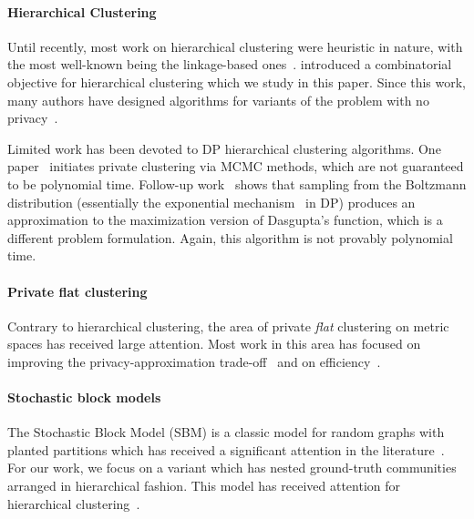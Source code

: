 \paragraph{Hierarchical Clustering}
Until recently, most work on hierarchical clustering were heuristic in nature, with the most well-known being the linkage-based ones~\citep{J10,bateni2017affinity}. \citet{dasgupta2016cost} introduced a combinatorial objective for hierarchical clustering which we study in this paper. Since this work, many authors have designed algorithms for variants of the problem with no privacy~\citep{cohen2017hierarchical,cohen2019hierarchical, charikar2017approximate,moseley2017approximation, agarwal2022sublinear,chatziafratis2020bisect}.

Limited work has been devoted to DP hierarchical clustering algorithms. One paper~\citep{xiao2014differentially} initiates private clustering via MCMC methods, which are not guaranteed to be polynomial time. Follow-up work~\citep{kolluri2021private} shows that sampling from the Boltzmann distribution (essentially the exponential mechanism~\citep{mcsherry2007mechanism} in DP) produces an approximation to the maximization version of Dasgupta's function, which is a different problem formulation. Again, this algorithm is not provably polynomial time.

\paragraph{Private flat clustering}
Contrary to hierarchical clustering, the area of private {\it flat} clustering on metric spaces has received large attention. Most work in this area has focused on improving the privacy-approximation trade-off~\citep{ghazi2020differentially,balcan2017differentially} and on efficiency~\citep{hegde2021sok,cohennear,cohen2022scalable}.

\paragraph{Stochastic block models}

The Stochastic Block Model (SBM) is a classic model for random graphs with planted partitions which has received a significant attention in the literature~\citep{MR3520025-Guedon16,montanari2016semidefinite, moitra2016robust,MR4115142,ding2022robust,Liu-Moitra-minimax}. For our work, we focus on a variant which has nested ground-truth communities arranged in hierarchical fashion. This model has received attention for hierarchical clustering~\citep{cohen2017hierarchical}.   

